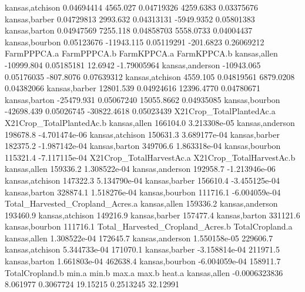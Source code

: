 \documentclass{report}
\begin{document}
\begin{Schunk}
\begin{Soutput}
kansas,atchison  0.04694414   4565.027 0.04719326   4259.6383  0.03375676
kansas,barber    0.04729813   2993.632 0.04313131  -5949.9352  0.05801383
kansas,barton    0.04947569   7255.118 0.04858703   5558.0733  0.04004437
kansas,bourbon   0.05123676 -11943.115 0.05119291   -201.6823  0.26069212
                FarmPPPCA.a FarmPPPCA.b FarmKPPCA.a FarmKPPCA.b
kansas,allen     -10999.804  0.05185181     12.6942 -1.79005964
kansas,anderson  -10943.065  0.05176035   -807.8076  0.07639312
kansas,atchison    4559.105  0.04819561   6879.0208  0.04382066
kansas,barber     12801.539  0.04924616  12396.4770  0.04780671
kansas,barton    -25479.931  0.05067240  15055.8662  0.04935085
kansas,bourbon   -42698.439  0.05026745 -30822.4618  0.05023439
                X21Crop_TotalPlantedAc.a X21Crop_TotalPlantedAc.b
kansas,allen                    166104.0             3.213308e-05
kansas,anderson                 198678.8            -4.701474e-06
kansas,atchison                 150631.3             3.689177e-04
kansas,barber                   182375.2            -1.987142e-04
kansas,barton                   349706.6             1.863318e-04
kansas,bourbon                  115321.4            -7.117115e-04
                X21Crop_TotalHarvestAc.a X21Crop_TotalHarvestAc.b
kansas,allen                    159336.2             1.308522e-04
kansas,anderson                 192958.7            -1.213946e-06
kansas,atchison                 147322.3             5.134790e-04
kansas,barber                   156610.4            -3.455125e-04
kansas,barton                   328874.1             1.518276e-04
kansas,bourbon                  111716.1            -6.004059e-04
                Total_Harvested_Cropland_Acres.a
kansas,allen                            159336.2
kansas,anderson                         193460.9
kansas,atchison                         149216.9
kansas,barber                           157477.4
kansas,barton                           331121.6
kansas,bourbon                          111716.1
                Total_Harvested_Cropland_Acres.b TotalCropland.a
kansas,allen                        1.308522e-04        172645.7
kansas,anderson                     1.550158e-05        229606.7
kansas,atchison                     5.344733e-04        171070.1
kansas,barber                      -3.158814e-04        211971.5
kansas,barton                       1.661803e-04        462638.4
kansas,bourbon                     -6.004059e-04        158911.7
                TotalCropland.b    min.a     min.b    max.a     max.b   heat.a
kansas,allen      -0.0006323836 8.061977 0.3067724 19.15215 0.2513245 32.12991

\end{Soutput}
\end{Schunk}
\end{document}
